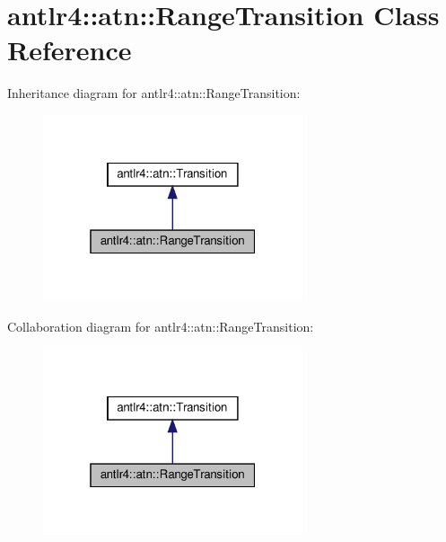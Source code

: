 \hypertarget{classantlr4_1_1atn_1_1RangeTransition}{}\section{antlr4\+:\+:atn\+:\+:Range\+Transition Class Reference}
\label{classantlr4_1_1atn_1_1RangeTransition}


Inheritance diagram for antlr4\+:\+:atn\+:\+:Range\+Transition\+:
\nopagebreak
\begin{figure}[H]
\begin{center}
\leavevmode
\includegraphics[width=217pt]{classantlr4_1_1atn_1_1RangeTransition__inherit__graph}
\end{center}
\end{figure}


Collaboration diagram for antlr4\+:\+:atn\+:\+:Range\+Transition\+:
\nopagebreak
\begin{figure}[H]
\begin{center}
\leavevmode
\includegraphics[width=217pt]{classantlr4_1_1atn_1_1RangeTransition__coll__graph}
\end{center}
\end{figure}
